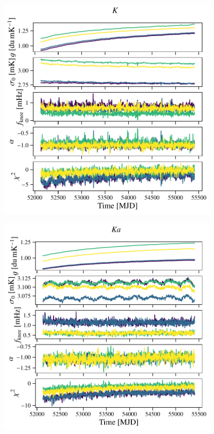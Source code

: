 \documentclass[twocolumn]{../../common/aa}
\begin{document}
\begin{figure}
	\centering
	\includegraphics[width=\columnwidth]{figures/inst_023-WMAP_K.pdf}
\end{figure}
\begin{figure}
	\centering
	\includegraphics[width=\columnwidth]{figures/inst_030-WMAP_Ka.pdf}
\end{figure}
\end{document}
